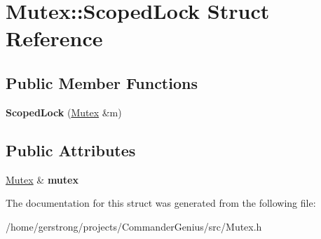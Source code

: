 \hypertarget{struct_mutex_1_1_scoped_lock}{
\section{Mutex::ScopedLock Struct Reference}
\label{struct_mutex_1_1_scoped_lock}
}
\subsection*{Public Member Functions}
\begin{DoxyCompactItemize}
\item 
\hypertarget{struct_mutex_1_1_scoped_lock_ad15abb0565db3107963964dac7fb423c}{
{\bfseries ScopedLock} (\hyperlink{class_mutex}{Mutex} \&m)}
\label{struct_mutex_1_1_scoped_lock_ad15abb0565db3107963964dac7fb423c}

\end{DoxyCompactItemize}
\subsection*{Public Attributes}
\begin{DoxyCompactItemize}
\item 
\hypertarget{struct_mutex_1_1_scoped_lock_ab0c63042aefe7eaa55a94762e967f40a}{
\hyperlink{class_mutex}{Mutex} \& {\bfseries mutex}}
\label{struct_mutex_1_1_scoped_lock_ab0c63042aefe7eaa55a94762e967f40a}

\end{DoxyCompactItemize}


The documentation for this struct was generated from the following file:\begin{DoxyCompactItemize}
\item 
/home/gerstrong/projects/CommanderGenius/src/Mutex.h\end{DoxyCompactItemize}
